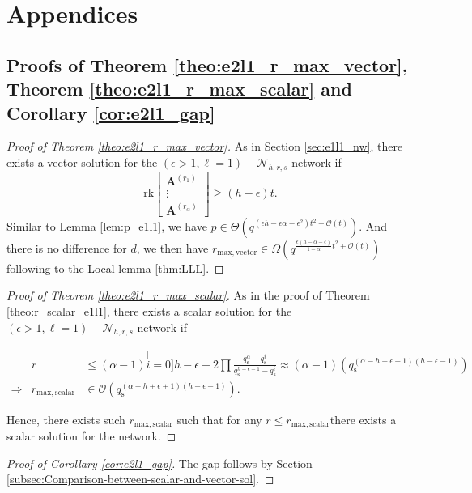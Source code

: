 \chapter{Appendices} \label{chap:appendix}

\section{Proofs of Theorem \ref{theo:e2l1_r_max_vector}, Theorem \ref{theo:e2l1_r_max_scalar}
and Corollary \ref{cor:e2l1_gap} \label{app:proofs_e2l1}}
\begin{proof}[Proof of Theorem \vref{theo:e2l1_r_max_vector}]
 As in Section \vref{sec:e1l1_nw}, there exists a vector solution
for the $\left(\epsilon>1,\ell=1\right)-\mathcal{N}_{h,r,s}$ network
if
\[
\mathrm{rk}\left[\begin{array}{c}
\boldsymbol{A}^{\left(r_{1}\right)}\\
\vdots\\
\boldsymbol{A}^{\left(r_{\alpha}\right)}
\end{array}\right]\geq\left(h-\epsilon\right)t.
\]
Similar to Lemma \ref{lem:p_e1l1}, we have $p\in\Theta\left(q^{\left(\epsilon h-\epsilon\alpha-\epsilon^{2}\right)t^{2}+\mathcal{O}(t)}\right)$.
And there is no difference for $d$, we then have $r_{\mathrm{max,vector}}\in\Omega\left(q^{\frac{\epsilon\left(h-\alpha-\epsilon\right)}{1-\alpha}t^{2}+\mathcal{O}(t)}\right)$
following to the Local lemma \ref{thm:LLL}.
\end{proof}
%
\begin{proof}[Proof of Theorem \vref{theo:e2l1_r_max_scalar}]
 As in the proof of Theorem \ref{theo:r_scalar_e1l1}, there exists
a scalar solution for the $\left(\epsilon>1,\ell=1\right)-\mathcal{N}_{h,r,s}$
network if

\begin{eqnarray*}
 & r & \leq\left(\alpha-1\right)\stackrel[i=0]{h-\epsilon-2}{\prod}\frac{q_{\mathrm{s}}^{\alpha}-q_{\mathrm{s}}^{i}}{q_{\mathrm{s}}^{h-\epsilon-1}-q_{\mathrm{s}}^{i}}\approx\left(\alpha-1\right)\left(q_{\mathrm{s}}^{\left(\alpha-h+\epsilon+1\right)\left(h-\epsilon-1\right)}\right)\\
\Rightarrow & r_{\mathrm{max,scalar}} & \in\mathcal{O}\left(q_{\mathrm{s}}^{\left(\alpha-h+\epsilon+1\right)\left(h-\epsilon-1\right)}\right).
\end{eqnarray*}

Hence, there exists such $r_{\mathrm{max,scalar}}$ such that for
any $r\leq r_{\mathrm{max,scalar}}$there exists a scalar solution
for the network.
\end{proof}
%
\begin{proof}[Proof of Corollary \vref{cor:e2l1_gap}]
 The gap follows by Section \ref{subsec:Comparison-between-scalar-and-vector-sol}.
\end{proof}

